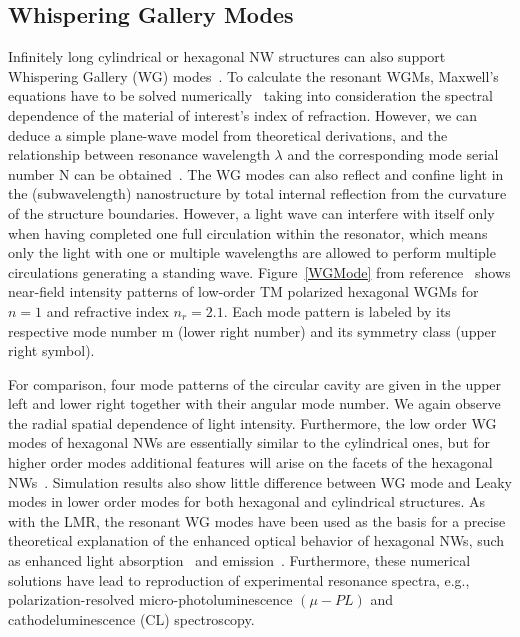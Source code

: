 \subsection{Whispering Gallery Modes}
\label{sec:WGM}

Infinitely long cylindrical or hexagonal NW structures can also support
Whispering Gallery (WG)
modes~\cite{Zimmler:2008fc,huang2001room,Zhao:2014jt,Nobis:2005wg,Czekalla:2010uw,Gargas:2009cx,Fallert:2008ej,Johnson:2002ua,Nobis:2004tp}.
To calculate the resonant WGMs, Maxwell's equations have to be solved
numerically~\cite{Wiersig:2003vo} taking into consideration the spectral
dependence of the material of interest's index of refraction. However, we can
deduce a simple plane-wave model from theoretical derivations, and the
relationship between resonance wavelength $\lambda$ and the corresponding mode
serial number N can be obtained~\cite{Nobis:2004tp}. The WG modes can also
reflect and confine light in the (subwavelength) nanostructure by total
internal reflection from the curvature of the structure boundaries. However, a
light wave can interfere with itself only when having completed one full
circulation within the resonator, which means only the light with one or
multiple wavelengths are allowed to perform multiple circulations generating a
standing wave. Figure~\ref{WGMode} from reference~\cite{Nobis:2005wg} shows
near-field intensity patterns of low-order TM polarized hexagonal WGMs for $n =
1$ and refractive index $n_r = 2.1$. Each mode pattern is labeled by its
respective mode number m (lower right number) and its symmetry class (upper
right symbol).

For comparison, four mode patterns of the circular cavity are given in the
upper left and lower right together with their angular mode number. We again
observe the radial spatial dependence of light intensity. Furthermore, the low
order WG modes of hexagonal NWs are essentially similar to the cylindrical
ones, but for higher order modes additional features will arise on the facets
of the hexagonal NWs~\cite{Nobis:2005wg}. Simulation results also show little
difference between WG mode and Leaky modes in lower order modes for both
hexagonal and cylindrical structures. As with the LMR, the resonant WG modes
have been used as the basis for a precise theoretical explanation of the
enhanced optical behavior of hexagonal NWs, such as enhanced light
absorption~\cite{Cao:2009ho,Kim:2014ig,Zhang:2013wb,Kelzenberg:2010fa,Wang:2013ux}
and emission~\cite{Zimmler:2008fc,Currie:2013to,Le:2014cp,Grzela:2012wa}.
Furthermore, these numerical solutions have lead to reproduction of
experimental resonance spectra, e.g., polarization-resolved
micro-photoluminescence $(\mu-PL)$ and cathodeluminescence (CL) spectroscopy.

